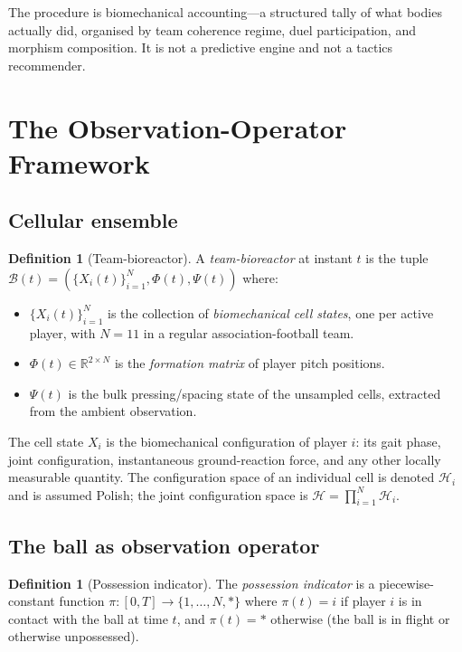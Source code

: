 \documentclass[11pt,twocolumn,a4paper]{article}
\theoremstyle{definition}
\newtheorem{definition}[theorem]{Definition}
\theoremstyle{remark}
\newcommand{\Hcal}{\mathcal{H}}
\newcommand{\Bcal}{\mathcal{B}}
\begin{document}
The procedure is biomechanical accounting---a structured tally of what
bodies actually did, organised by team coherence regime, duel
participation, and morphism composition. It is not a predictive engine
and not a tactics recommender.

\section{The Observation-Operator Framework}
\label{sec:obsop}

\subsection{Cellular ensemble}

\begin{definition}[Team-bioreactor]
\label{def:bioreactor}
A \emph{team-bioreactor} at instant $t$ is the tuple
$\Bcal(t) = (\{X_i(t)\}_{i=1}^{N}, \Phi(t), \Psi(t))$ where:
\begin{itemize}[leftmargin=1.4em]
  \item $\{X_i(t)\}_{i=1}^{N}$ is the collection of \emph{biomechanical
    cell states}, one per active player, with $N = 11$ in a regular
    association-football team.
  \item $\Phi(t) \in \mathbb{R}^{2 \times N}$ is the \emph{formation
    matrix} of player pitch positions.
  \item $\Psi(t)$ is the bulk pressing/spacing state of the unsampled
    cells, extracted from the ambient observation.
\end{itemize}
\end{definition}

The cell state $X_i$ is the biomechanical configuration of player $i$:
its gait phase, joint configuration, instantaneous ground-reaction force,
and any other locally measurable quantity. The configuration space of an
individual cell is denoted $\Hcal_i$ and is assumed Polish; the joint
configuration space is $\Hcal = \prod_{i=1}^{N} \Hcal_i$.

\subsection{The ball as observation operator}

\begin{definition}[Possession indicator]
\label{def:possession}
The \emph{possession indicator} is a piecewise-constant function
$\pi : [0,T] \to \{1, \ldots, N, *\}$ where $\pi(t) = i$ if player $i$
is in contact with the ball at time $t$, and $\pi(t) = *$ otherwise
(the ball is in flight or otherwise unpossessed).
\end{definition}
\end{document}
